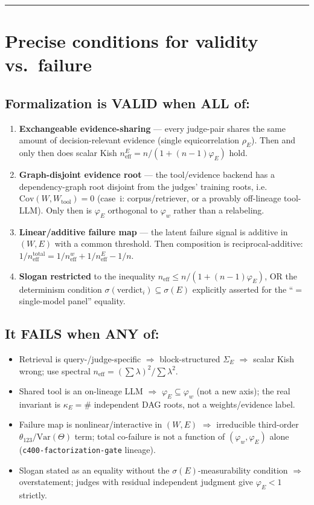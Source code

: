 \documentclass[11pt,a4paper]{article}
\begin{document}
\bigskip
\hrule
\bigskip

\section*{Precise conditions for validity vs.\ failure}

\subsection*{Formalization is VALID when ALL of:}
\begin{enumerate}
\item \textbf{Exchangeable evidence-sharing} --- every judge-pair shares the same amount of
  decision-relevant evidence (single equicorrelation $\rho_E$).
  Then and only then does scalar Kish
  $n_{\mathrm{eff}}^E = n/(1+(n-1)\varphi_E)$ hold.
\item \textbf{Graph-disjoint evidence root} --- the tool/evidence backend has a dependency-graph
  root disjoint from the judges' training roots, i.e.\ $\mathrm{Cov}(W, W_{\mathrm{tool}}) = 0$
  (case~i: corpus/retriever, or a provably off-lineage tool-LLM).
  Only then is $\varphi_E$ orthogonal to $\varphi_w$ rather than a relabeling.
\item \textbf{Linear/additive failure map} --- the latent failure signal is additive in $(W,E)$
  with a common threshold.
  Then composition is reciprocal-additive:
  $1/n_{\mathrm{eff}}^{\mathrm{total}} = 1/n_{\mathrm{eff}}^w + 1/n_{\mathrm{eff}}^E - 1/n$.
\item \textbf{Slogan restricted} to the inequality
  $n_{\mathrm{eff}} \leq n/(1+(n-1)\varphi_E)$, OR the determinism condition
  $\sigma(\mathrm{verdict}_i) \subseteq \sigma(E)$ explicitly asserted for the
  ``$=$ single-model panel'' equality.
\end{enumerate}

\subsection*{It FAILS when ANY of:}
\begin{itemize}
\item Retrieval is query-/judge-specific $\Rightarrow$ block-structured $\Sigma_E$ $\Rightarrow$
  scalar Kish wrong; use spectral
  $n_{\mathrm{eff}} = (\sum\lambda)^2/\sum\lambda^2$.
\item Shared tool is an on-lineage LLM $\Rightarrow$ $\varphi_E \subseteq \varphi_w$ (not a new
  axis); the real invariant is $\kappa_E = \#$ independent DAG roots, not a weights/evidence label.
\item Failure map is nonlinear/interactive in $(W,E)$ $\Rightarrow$ irreducible third-order
  $\theta_{123}/\mathrm{Var}(\Theta)$ term; total co-failure is not a function of
  $(\varphi_w, \varphi_E)$ alone (\texttt{c400-factorization-gate} lineage).
\item Slogan stated as an equality without the $\sigma(E)$-measurability condition $\Rightarrow$
  overstatement; judges with residual independent judgment give $\varphi_E < 1$ strictly.
\end{itemize}
\end{document}
